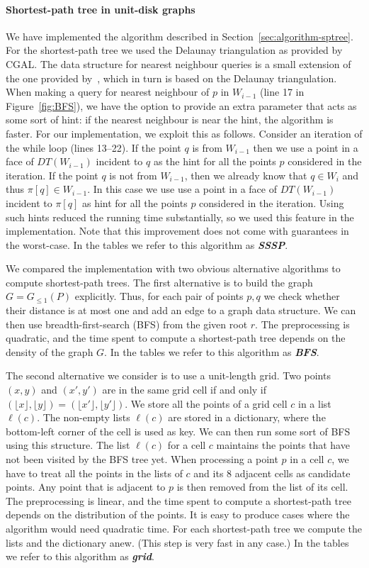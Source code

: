 \documentclass[a4paper,11pt]{article}
\newcommand{\GG}{\ensuremath{G_{\le 1}}}
\def\DEF#1{\textbf{\emph{#1}}}
\let\le\leqslant
\begin{document}
\paragraph{Shortest-path tree in unit-disk graphs}
We have implemented the algorithm described in Section~\ref{sec:algorithm-sptree}.
For the shortest-path tree we used the Delaunay triangulation as provided by CGAL.
The data structure for nearest neighbour queries is a small extension of
the one provided by~\cite{cgal:k-vda2-15a}, which in turn is based on the Delaunay triangulation.
When making a query for nearest neighbour of $p$ in $W_{i-1}$ (line 17 in Figure~\ref{fig:BFS}), 
we have the option to provide an extra parameter that acts as some sort of hint: 
if the nearest neighbour is near the hint, the algorithm is faster. 
For our implementation, we exploit this as follows. 
Consider an iteration of the while loop (lines 13--22). If the point $q$ is from $W_{i-1}$
then we use a point in a face of $DT(W_{i-1})$ incident to $q$ as the hint
for all the points $p$ considered in the iteration.
If the point $q$ is not from $W_{i-1}$, then we already know that $q\in W_i$ and 
thus $\pi[q]\in W_{i-1}$. In this case we use use a point in a face of $DT(W_{i-1})$
incident to $\pi[q]$
as hint for all the points $p$ considered in the iteration.
Using such hints reduced the running time substantially, 
so we used this feature in the implementation.
Note that this improvement does not come with guarantees in the worst-case.
In the tables we refer to this algorithm as \DEF{SSSP}.

We compared the implementation with two obvious alternative algorithms to
compute shortest-path trees.
The first alternative is to build the graph $G=\GG(P)$ explicitly. 
Thus, for each pair of points $p,q$ we check whether their distance is
at most one and add an edge to a graph data structure.
We can then use breadth-first-search (BFS) from the given root $r$.
The preprocessing is quadratic, and the time spent to compute
a shortest-path tree depends on the density of the graph $G$.
In the tables we refer to this algorithm as \DEF{BFS}.

The second alternative we consider is to use a unit-length grid. 
Two points $(x,y)$ and $(x',y')$ are in the same grid cell
if and only if 
$(\lfloor x\rfloor ,\lfloor y\rfloor)=(\lfloor x'\rfloor ,\lfloor y'\rfloor)$.
We store all the points of a grid cell $c$ in a list $\ell(c)$.
The non-empty lists $\ell(c)$ are stored in a dictionary,
where the bottom-left corner of the cell is used as key.
We can then run some sort of BFS using this structure. 
The list $\ell(c)$ for a cell $c$ maintains the points that
have not been visited by the BFS tree yet. When processing
a point $p$ in a cell $c$, we have to treat all the points 
in the lists of $c$ and its $8$ adjacent cells as candidate points.
Any point that is adjacent to $p$ is then removed from the list of its cell. 
The preprocessing is linear, and the time spent to compute
a shortest-path tree depends on the distribution of the points.
It is easy to produce cases where the algorithm would need quadratic time.
For each shortest-path tree we compute the lists and the dictionary anew.
(This step is very fast in any case.)
In the tables we refer to this algorithm as \DEF{grid}.
\end{document}
